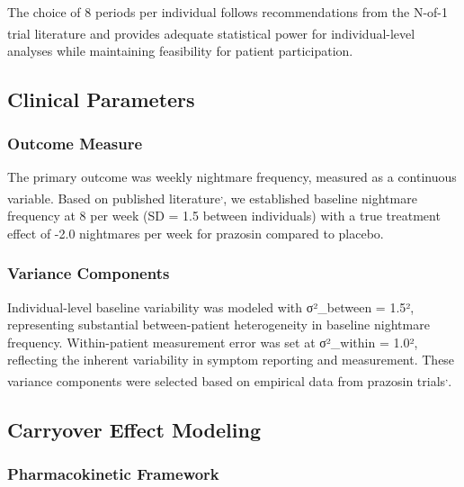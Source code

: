 \documentclass[
  11pt,
]{article}
\begin{document}
The choice of 8 periods per individual follows recommendations from the
N-of-1 trial
literature\textsuperscript{}
and provides adequate statistical power for individual-level analyses
while maintaining feasibility for patient participation.

\subsection{Clinical Parameters}\label{clinical-parameters}

\subsubsection{Outcome Measure}\label{outcome-measure}

The primary outcome was weekly nightmare frequency, measured as a
continuous variable. Based on published
literature\textsuperscript{,},
we established baseline nightmare frequency at 8 per week (SD = 1.5
between individuals) with a true treatment effect of -2.0 nightmares per
week for prazosin compared to placebo.

\subsubsection{Variance Components}\label{variance-components}

Individual-level baseline variability was modeled with σ²\_between =
1.5², representing substantial between-patient heterogeneity in baseline
nightmare frequency. Within-patient measurement error was set at
σ²\_within = 1.0², reflecting the inherent variability in symptom
reporting and measurement. These variance components were selected based
on empirical data from prazosin
trials\textsuperscript{,}.

\subsection{Carryover Effect Modeling}\label{carryover-effect-modeling}

\subsubsection{Pharmacokinetic
Framework}\label{pharmacokinetic-framework}
\end{document}
